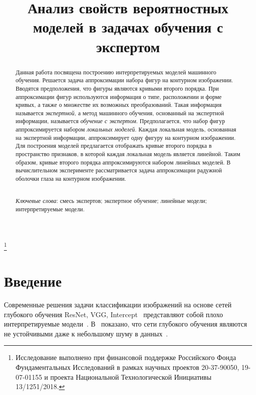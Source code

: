 \documentclass[12pt]{a&t}
\begin{document}

\title{Анализ свойств вероятностных моделей в задачах обучения с экспертом}%
\thanks{Исследование выполнено при финансовой поддержке Российского Фонда Фундаментальных Исследований в рамках научных проектов 20-37-90050, 19-07-01155 и проекта Национальной Технологической Инициативы 13/1251/2018.}



\maketitle

\begin{abstract}
Данная работа посвящена построению интерпретируемых моделей машинного обучения.
Решается задача аппроксимации набора фигур на контурном изображении.
Вводятся предположения, что фигуры являются кривыми второго порядка.
При аппроксимации фигур используются информация о типе, расположении и форме кривых, а также о множестве их возможных преобразований.
Такая информация называется \textit{экспертной}, а метод машинного обучения, основанный на экспертной информации, называется \textit{обучение с экспертом}.
Предполагается, что набор фигур аппроксимируется набором \textit{локальных моделей}.
Каждая локальная модель, основанная на экспертной информации, аппроксимирует одну фигуру на контурном изображении.
Для построения моделей предлагается отображать кривые второго порядка в пространство признаков, в которой каждая локальная модель является линейной.
Таким образом, кривые второго порядка аппроксимируются набором линейных моделей.
В вычислительном эксперименте рассматривается задача аппроксимации радужной оболочки глаза на контурном изображении.

\smallskip\\
\textit{Ключевые слова}: смесь экспертов; экспертное обучение; линейные модели; интерпретируемые модели.
\end{abstract}

\section{Введение}
Современные решения задачи классификации изображений на основе сетей глубокого обучения ResNet, VGG, Intercept~\cite{Kaiming2015} представляют собой плохо интерпретируемые модели~\cite{Ribeiro2016}.
В~\cite{Han2020, Akhtar2018} показано, что сети глубокого обучения являются не устойчивыми даже к небольшому шуму в данных~\cite{Grabovoy2022ait}.
\end{document}
